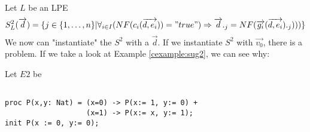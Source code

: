 \index{}\documentclass[a4paper,10pt]{article}
\theoremstyle{plain}
\theoremstyle{definition}
\newcommand{\ovr}{\overrightarrow}
\begin{document}
\begin{defn}\label{def:sug2}  Let $L$ be an LPE
\begin{displaymath}
S_L^2(\ovr{d})=
\lbrace   
j \in \lbrace 1, \ldots , n \rbrace \vert \forall_{i\in I} (NF(c_i(\ovr{d,e_i})) = "true") \Rightarrow \ovr{d}._j = NF(\ovr{g_i}(\ovr{d,e_i})._j)))\rbrace
\end{displaymath}
We now can "instantiate" the $S^2$ with a $\ovr{d}$. If we instantiate $S^2$ with $\ovr{v_0}$, there is a problem. If we take a look at Example \ref{cexample:sug2}, we can see why:

\begin{example} Let $E2$ be\label{cexample:sug2}\begin{verbatim} 
 
proc P(x,y: Nat) = (x=0) -> P(x:= 1, y:= 0) +
                   (x=1) -> P(x:= x, y:= 1);
init P(x := 0, y:= 0);


\end{verbatim}
\end{example}
\end{defn}
\end{document}
